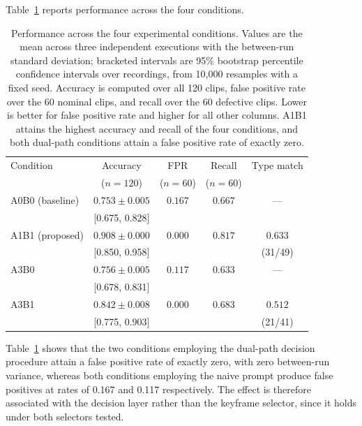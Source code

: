 Table~\ref{tab:mainresults} reports performance across the four
conditions.

\begin{table}[htbp]
\centering
\caption{Performance across the four experimental conditions. Values are
the mean across three independent executions with the between-run standard
deviation; bracketed intervals are 95\% bootstrap percentile confidence
intervals over recordings, from 10{,}000 resamples with a fixed seed.
Accuracy is computed over all 120 clips, false positive rate over the 60
nominal clips, and recall over the 60 defective clips. Lower is better for
false positive rate and higher for all other columns. A1B1 attains the
highest accuracy and recall of the four conditions, and both dual-path
conditions attain a false positive rate of exactly zero.}
\label{tab:mainresults}
\small
\begin{tabular}{@{}lcccc@{}}
\toprule
Condition & Accuracy & FPR & Recall & Type match \\
          & ($n{=}120$) & ($n{=}60$) & ($n{=}60$) & \\
\midrule
A0B0 (baseline)
  & $0.753 \pm 0.005$ & $0.167$ & $0.667$ & --- \\
  & \footnotesize[0.675, 0.828] & & & \\
A1B1 (proposed)
  & $\mathbf{0.908} \pm 0.000$ & $\mathbf{0.000}$ & $\mathbf{0.817}$ & $0.633$ \\
  & \footnotesize[0.850, 0.958] & & & \footnotesize(31/49) \\
A3B0
  & $0.756 \pm 0.005$ & $0.117$ & $0.633$ & --- \\
  & \footnotesize[0.678, 0.831] & & & \\
A3B1
  & $0.842 \pm 0.008$ & $\mathbf{0.000}$ & $0.683$ & $0.512$ \\
  & \footnotesize[0.775, 0.903] & & & \footnotesize(21/41) \\
\bottomrule
\end{tabular}
\end{table}

Table~\ref{tab:mainresults} shows that the two conditions employing the
dual-path decision procedure attain a false positive rate of exactly zero,
with zero between-run variance, whereas both conditions employing the
naive prompt produce false positives at rates of 0.167 and 0.117
respectively. The effect is therefore associated with the decision layer
rather than the keyframe selector, since it holds under both selectors
tested.

